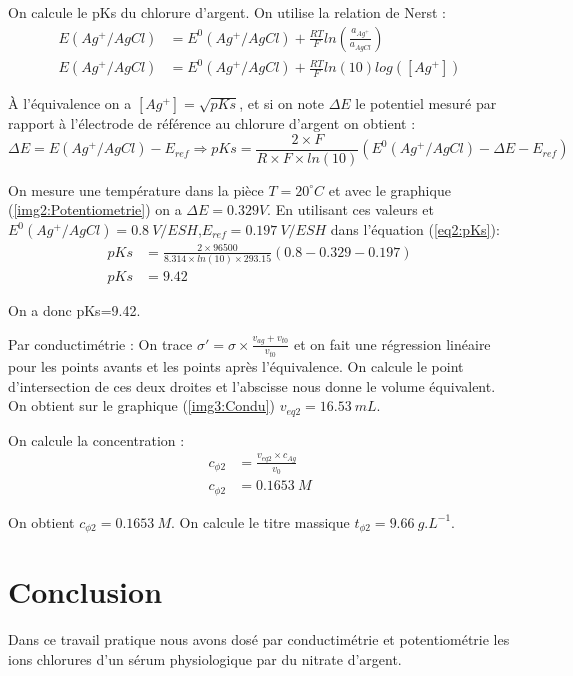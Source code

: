 \documentclass[12pt]{article}
\begin{document}
On calcule le pKs du chlorure d'argent. On utilise la relation de Nerst : 
\begin{align*}
    E(Ag^+/AgCl)& = E^0(Ag^+/AgCl) + \frac{R T}{F}ln(\frac{a_{Ag^+}}{a_{AgCl}}) \\
    E(Ag^+/AgCl)& = E^0(Ag^+/AgCl) + \frac{R T}{F}ln(10) log([Ag^+])
\end{align*}

À l'équivalence on a $[Ag^+]= \sqrt{pKs}$, et si on note $\Delta E$ le potentiel mesuré par rapport à l'électrode de référence au chlorure d'argent on obtient :
\begin{equation}
    \Delta E = E(Ag^+/AgCl) - E_{ref} \Longrightarrow pKs = \frac{2 \times F}{R \times F \times ln(10)}(E^0(Ag^+/AgCl)-\Delta E - E_{ref})
    \label{eq2:pKs}
\end{equation}

On mesure une température dans la pièce $T=20^\circ C$ et avec le graphique (\ref{img2:Potentiometrie}) on a $\Delta E = 0.329 V $.
En utilisant ces valeurs et $E^0(Ag^+/AgCl)=0.8 \ V/ESH$,$E_{ref}= 0.197 \ V/ESH$ dans l'équation (\ref{eq2:pKs}):
\begin{align*}
    pKs &= \frac{2 \times 96500}{8.314 \times ln(10) \times 293.15}(0.8-0.329-0.197) \\
    pKs &= 9.42
\end{align*}

On a donc pKs=9.42.

Par conductimétrie : On trace $\sigma ' =\sigma \times \frac{v_{ag}+v_{t0}}{v_{t0}}$ et on fait une régression linéaire pour les points avants et les points après l'équivalence.
On calcule le point d'intersection de ces deux droites et l'abscisse nous donne le volume équivalent.
On obtient sur le graphique (\ref{img3:Condu}) $v_{eq2}=16.53 \ mL$. 

On calcule la concentration :
\begin{align*}
    c_{\phi 2} &= \frac{v_{eq2}\times c_{Ag}}{v_0} \\
    c_{\phi 2} &= 0.1653 \ M
\end{align*}

On obtient $ c_{\phi 2} = 0.1653 \ M $. On calcule le titre massique $t_{\phi 2}=9.66 \ g.L^{-1}$.

\section*{Conclusion}

Dans ce travail pratique nous avons dosé par conductimétrie et potentiométrie les ions chlorures d'un sérum physiologique par du nitrate d'argent.
\end{document}
